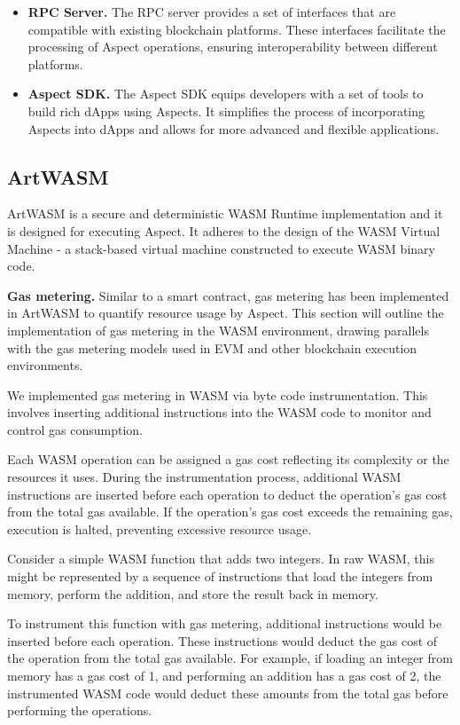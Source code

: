 \begin{itemize}
  \item \textbf{RPC Server.} The RPC server provides a set of interfaces that are compatible with existing blockchain platforms. These interfaces facilitate the processing of Aspect operations, ensuring interoperability between different platforms.
  
  \item \textbf{Aspect SDK.} The Aspect SDK equips developers with a set of tools to build rich dApps using Aspects. It simplifies the process of incorporating Aspects into dApps and allows for more advanced and flexible applications.
\end{itemize}

\subsection{ArtWASM}

ArtWASM is a secure and deterministic WASM Runtime implementation and it is designed for executing Aspect. It adheres to the design of the WASM Virtual Machine - a stack-based virtual machine constructed to execute WASM binary code.

\textbf{Gas metering.} Similar to a smart contract, gas metering has been implemented in ArtWASM to quantify resource usage by Aspect. This section will outline the implementation of gas metering in the WASM environment, drawing parallels with the gas metering models used in EVM and other blockchain execution environments.

We implemented gas metering in WASM via byte code instrumentation. This involves inserting additional instructions into the WASM code to monitor and control gas consumption.

Each WASM operation can be assigned a gas cost reflecting its complexity or the resources it uses. During the instrumentation process, additional WASM instructions are inserted before each operation to deduct the operation's gas cost from the total gas available. If the operation's gas cost exceeds the remaining gas, execution is halted, preventing excessive resource usage.

Consider a simple WASM function that adds two integers. In raw WASM, this might be represented by a sequence of instructions that load the integers from memory, perform the addition, and store the result back in memory.

To instrument this function with gas metering, additional instructions would be inserted before each operation. These instructions would deduct the gas cost of the operation from the total gas available. For example, if loading an integer from memory has a gas cost of 1, and performing an addition has a gas cost of 2, the instrumented WASM code would deduct these amounts from the total gas before performing the operations.

